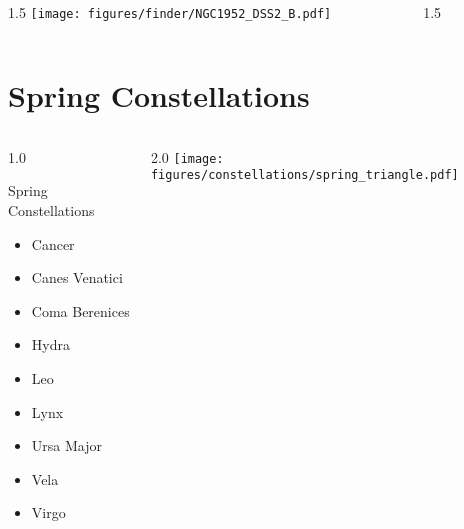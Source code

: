 \documentclass[final]{beamer}
\newlength{\colwidth}
\begin{document}

\begin{frame}[t]{}
  \begin{columns}[T]
    \begin{column}{1.5\colwidth}
      \centering
      \texttt{[image: figures/finder/NGC1952\_DSS2\_B.pdf]}
    \end{column}
    \begin{column}{1.5\colwidth}
      \Large
      
    \end{column}
  \end{columns}
\end{frame}


\section{Spring Constellations}

\begin{frame}[t]{}
  \begin{columns}[T]
    \begin{column}{1.0\colwidth}
      \Large
      \begin{block}{Spring Constellations}
        \begin{itemize}
          \item{Cancer}
          \item{Canes Venatici}
          \item{Coma Berenices}
          \item{Hydra}
          \item{Leo}
          \item{Lynx}
          \item{Ursa Major}
          \item{Vela}
          \item{Virgo}
        \end{itemize}
      \end{block}
    \end{column}
    \begin{column}{2.0\colwidth}
      \centering
      \texttt{[image: figures/constellations/spring\_triangle.pdf]}
    \end{column}
  \end{columns}
\end{frame}
\end{document}
